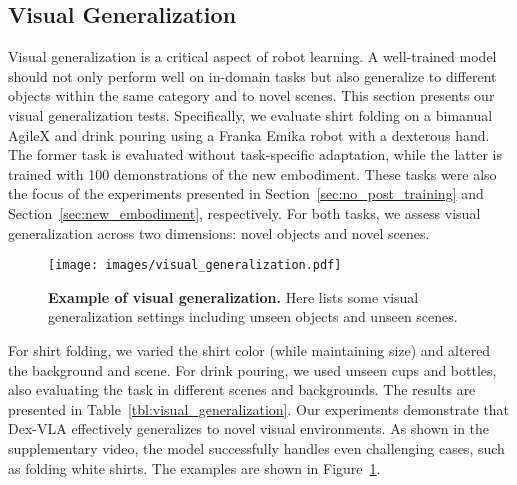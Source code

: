 \clearpage
\newpage
\begin{appendix}




\subsection{Visual Generalization}
Visual generalization is a critical aspect of robot learning.  A well-trained model should not only perform well on in-domain tasks but also generalize to different objects within the same category and to novel scenes. This section presents our visual generalization tests. Specifically, we evaluate shirt folding on a bimanual AgileX and drink pouring using a Franka Emika robot with a dexterous hand. The former task is evaluated without task-specific adaptation, while the latter is trained with 100 demonstrations of the new embodiment. These tasks were also the focus of the experiments presented in Section~\ref{sec:no_post_training} and Section~\ref{sec:new_embodiment}, respectively. For both tasks, we assess visual generalization across two dimensions: novel objects and novel scenes.

\begin{figure}[t]
    \centering
    \texttt{[image: images/visual\_generalization.pdf]}
    \caption{\textbf{Example of visual generalization.} Here lists some visual generalization settings including unseen objects and unseen scenes.}\label{fig:visual_generalization}
\end{figure}

\begin{table*}[t]
  \centering
  \caption{\textbf{Visual Generalizaton for Dex-VLA}. For each evaluation setting, we report the averaged scores across 3 trials.}
  \label{tbl:visual_generalization}
\end{table*}
For shirt folding, we varied the shirt color (while maintaining size) and altered the background and scene.  For drink pouring, we used unseen cups and bottles, also evaluating the task in different scenes and backgrounds.  The results are presented in Table~\ref{tbl:visual_generalization}.  Our experiments demonstrate that Dex-VLA effectively generalizes to novel visual environments.  As shown in the supplementary video, the model successfully handles even challenging cases, such as folding white shirts. The examples are shown in Figure~\ref{fig:visual_generalization}.





\end{appendix}
